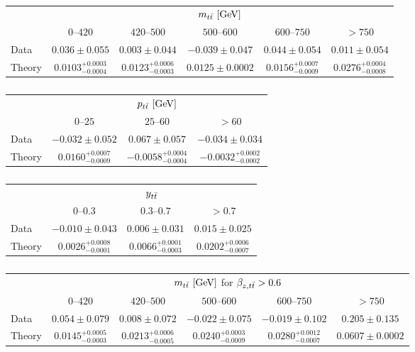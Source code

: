 \begin{table}[!htp]\centering
\begin{tabular}{l c c c c c }
  \toprule
  &\multicolumn{5}{c}{$m_{t\bar{t}}{}~[\rm{GeV}]$}    \\
  \ac{} & $0$--$420$ & $420$--$500$ & $500$--$600$ & $600$--$750$ & $>750$ \\
  \midrule
  Data & $0.036\pm0.055$ & $0.003\pm0.044$ & $-0.039\pm0.047$ & $0.044\pm0.054$ & $0.011\pm0.054$ \\
  Theory & $0.0103^{+0.0003}_{-0.0004}$ & $0.0123^{+0.0006}_{-0.0003}$ & $0.0125\pm0.0002$ & $0.0156^{+0.0007}_{-0.0009}$ & $0.0276^{+0.0004}_{-0.0008}$ \\
  \bottomrule
\end{tabular}
\caption{ }
\label{tab:results_mtt}
\end{table}
%
\begin{table}[!htp]\centering
\caption{ }
\begin{tabular}{l c c c }
  \toprule
  &\multicolumn{3}{c}{$p_{t\bar{t}}{}~[\rm{GeV}]$}    \\
  \ac{} &     $0$--$25$           &        $25$--$60$         &  $>60$            \\
  \midrule
  Data  &    $-0.032\pm0.052$       &     $0.067\pm0.057$       &      $-0.034\pm0.034$     \\
  Theory & $0.0160^{+0.0007}_{-0.0009}$ & $-0.0058^{+0.0004}_{-0.0004}$ & $-0.0032^{+0.0002}_{-0.0002}$  \\
  \bottomrule
\end{tabular}
\label{tab:results_pttt}
\end{table}
%
\begin{table}[!htp]\centering
\caption{ }
\begin{tabular}{l c c c }
  \toprule
  &\multicolumn{3}{c}{$y_{t\bar{t}}{}$}    \\
  \ac{}  &     $0$--$0.3$          &        $0.3$--$0.7$     &  $>0.7$            \\
  \midrule
  Data  &    $-0.010\pm0.043$       &     $0.006\pm0.031$     &      $0.015\pm0.025$     \\
  Theory & $0.0026^{+0.0008}_{-0.0001}$ & $0.0066^{+0.0001}_{-0.0003}$ & $0.0202^{+0.0006}_{-0.0007}$ \\
  \bottomrule
\end{tabular}
\label{tab:results_ytt}
\end{table}
%
\begin{table}[!htp]\centering
\caption{ }
\begin{tabular}{l c c c c c }
  \toprule
  &\multicolumn{5}{c}{$m_{t\bar{t}}{}~[\rm{GeV}]$ for $\beta_{z,t\bar{t}}{} > 0.6$}    \\
  \ac{} & $0$--$420$ & $420$--$500$ & $500$--$600$ & $600$--$750$ & $>750$ \\
  \midrule
  Data  & $0.054 \pm  0.079 $ & $0.008 \pm 0.072  $ & $-0.022 \pm 0.075 $ & $-0.019 \pm 0.102    $ & $0.205 \pm 0.135$ \\
  Theory & $0.0145^{+0.0005}_{-0.0003}$ & $0.0213^{+0.0006}_{-0.0005}$ & $0.0240^{+0.0003}_{-0.0009}$ & $0.0280^{+0.0012}_{-0.0007}$ & $0.0607 \pm 0.0002$ \\
  \bottomrule
\end{tabular}
\label{tab:results_mtt_beta}
\end{table}
